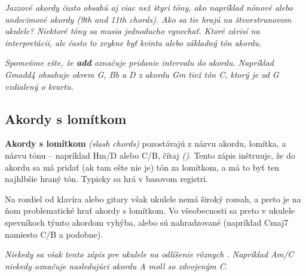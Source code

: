 \bigskip

\textit{%
Jazzové akordy často obsahú aj viac než štyri tóny, ako napríklad nónové alebo undecimové akordy (9th and 11th chords). Ako sa tie hrajú na štvorstrunovom ukulele? Niektoré tóny sa musia jednoducho vynechať. Ktoré závisí na interpretácii, ale často to zvykne byť kvinta alebo základný tón akordu.
}

\textit{%
Spomeňme ešte, že \textbf{add} označuje pridanie intervalu do akordu. Napríklad Gmadd4 obsahuje okrem G, Bb a D z akordu Gm tiež tón C, ktorý je od G vzdialený o kvartu.
}

\subsection*{Akordy s lomítkom}

\textbf{Akordy s lomítkom} \textit{(slash chords)} pozostávajú z názvu akordu, lomítka, a názvu tónu
-- napríklad Hm/D alebo C/B, čítaj  \textit{()}. Tento zápis inštruuje, že do akordu
sa má pridať (ak tam ešte nie je) tón za lomítkom, a má to byť ten najhlbšie hraný tón. Typicky sa hrá v basovom registri.

Na rozdiel od klavíra alebo gitary však ukulele nemá široký rozsah, a preto je na ňom problematické
hrať akordy s lomítkom. Vo všeobecnosti sa preto v ukulele spevníkoch týmto akordom vyhýba,
alebo sú nahradzované (napríklad Cmaj7 namiesto C/B a podobne).

\textit{%
Niekedy sa však tento zápis pre ukulele  na odlíšenie rôznych .
Napríklad Am/C niekedy označuje nasledujúci  akordu A moll so zdvojeným C.
}

\begin{center}
\normalsize
{}
\end{center}


\endgroup